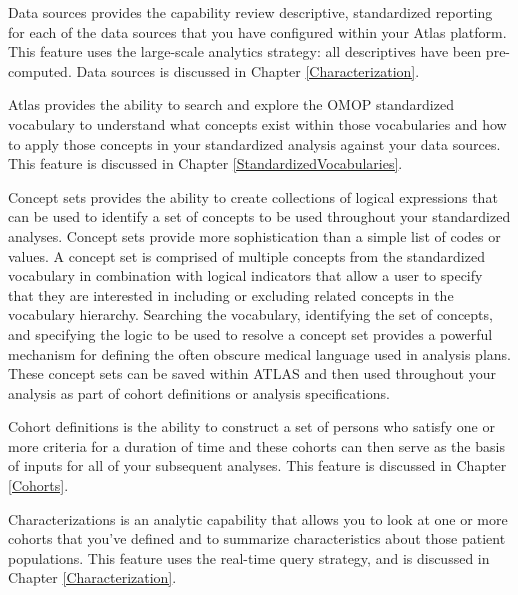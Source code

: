 \documentclass[11pt]{book}
\providecommand{\tightlist}{%
  \setlength{\itemsep}{0pt}\setlength{\parskip}{0pt}}
\theoremstyle{definition}
\theoremstyle{definition}
\theoremstyle{definition}
\theoremstyle{remark}
\begin{document}
\begin{description}
\tightlist
\item[Data Sources \index{ATLAS!Data Sources}
\index{Achilles|see {ATLAS!data sources}}]
Data sources provides the capability review descriptive, standardized
reporting for each of the data sources that you have configured within
your Atlas platform. This feature uses the large-scale analytics
strategy: all descriptives have been pre-computed. Data sources is
discussed in Chapter \ref{Characterization}.
\item[Vocabulary Search \index{ATLAS!vocabulary search}]
Atlas provides the ability to search and explore the OMOP standardized
vocabulary to understand what concepts exist within those vocabularies
and how to apply those concepts in your standardized analysis against
your data sources. This feature is discussed in Chapter
\ref{StandardizedVocabularies}.
\item[Concept Sets \index{ATLAS!concept sets}]
Concept sets provides the ability to create collections of logical
expressions that can be used to identify a set of concepts to be used
throughout your standardized analyses. Concept sets provide more
sophistication than a simple list of codes or values. A concept set is
comprised of multiple concepts from the standardized vocabulary in
combination with logical indicators that allow a user to specify that
they are interested in including or excluding related concepts in the
vocabulary hierarchy. Searching the vocabulary, identifying the set of
concepts, and specifying the logic to be used to resolve a concept set
provides a powerful mechanism for defining the often obscure medical
language used in analysis plans. These concept sets can be saved within
ATLAS and then used throughout your analysis as part of cohort
definitions or analysis specifications.
\item[Cohort Definitions \index{ATLAS!cohort definitions}]
Cohort definitions is the ability to construct a set of persons who
satisfy one or more criteria for a duration of time and these cohorts
can then serve as the basis of inputs for all of your subsequent
analyses. This feature is discussed in Chapter \ref{Cohorts}.
\item[Characterizations \index{ATLAS!cohort characterization}]
Characterizations is an analytic capability that allows you to look at
one or more cohorts that you've defined and to summarize characteristics
about those patient populations. This feature uses the real-time query
strategy, and is discussed in Chapter \ref{Characterization}.

\end{description}
\end{document}
